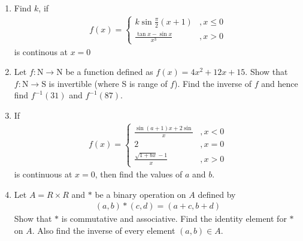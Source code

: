\begin{enumerate}
	\item Find $k$, if 
	\begin{align*}
		f(x) = \begin{cases} k\sin \frac{\pi}{2}(x+1) &,x \leq 0\\
		\frac{\tan x - \sin x}{x^3} &, x>0
		\end{cases}
	\end{align*}
is continous at $x=0$
	
	\item Let $f: \text{N} \rightarrow \text{N}$ be a function defined as 
	$f(x) = 4x^2 + 12x + 15.$
Show that $f: \text{N} \rightarrow \text{S}$ is invertible (where S is range of $f$).
Find the inverse of $f$ and hence find $f^{-1}(31)$ and $f^{-1}(87)$.


	\item If 
	\begin{align*}
		f(x) = 
		\begin{cases}
			\frac{\sin(a+1)x + 2\sin}{x} &,x<0 \\
			2 &,x = 0\\
			\frac{\sqrt{1+bx}-1}{x} &,x>0
		\end{cases}
	\end{align*}
is continuous at $x = 0$, then find the values of $a$ and $b$.

	\item Let $A = R \times R$ and $*$ be a binary operation on $A$ defined by
	\begin{align*}
		(a, b) * (c, d) = (a + c, b + d)
	\end{align*}
	Show that $*$ is commutative and associative. Find the identity element for $*$
on $A$. Also find the inverse of every element $(a, b) \in A$.
\end{enumerate}
